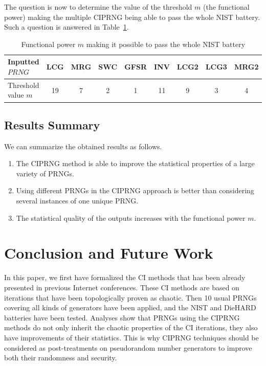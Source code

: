 \documentclass[10pt, conference, compsocconf]{IEEEtran}
\begin{document}
The question is now to determine the value of the threshold $m$ (the functional power) making 
the multiple CIPRNG being able to pass the whole NIST battery.
Such a question is answered in Table~\ref{threshold}.


\begin{table}
\renewcommand{\arraystretch}{1.3}
\caption{Functional power $m$ making it possible to pass the whole NIST battery}
\label{threshold}
\centering
  \begin{tabular}{|l||c|c|c|c|c|c|c|c|}
    \hline
Inputted $PRNG$ & LCG & MRG & SWC & GFSR & INV& LCG2 & LCG3  & MRG2 \\ \hline\hline
Threshold  value $m$& 19 & 7  & 2& 1 & 11& 9& 3& 4\\ \hline\hline
\end{tabular}
\end{table}

\subsection{Results Summary}

We can summarize the obtained results as follows.
\begin{enumerate}
\item The CIPRNG method is able to improve the statistical properties of a large variety of PRNGs.
\item Using different PRNGs in the CIPRNG approach is better than considering several instances of one unique PRNG.
\item The statistical quality of the outputs increases with the functional power $m$.
\end{enumerate}

\section{Conclusion and Future Work}

In this paper, we first have formalized the CI methods that has been already presented in previous Internet conferences.
These CI methods are based on iterations that have been topologically proven as chaotic.
Then 10 usual PRNGs covering all kinds of generators have been applied, and the NIST and DieHARD batteries have been tested.
Analyses show that PRNGs using the CIPRNG methods do not only inherit the chaotic properties of the
CI iterations, they also have improvements of their statistics.
This is why CIPRNG techniques should be considered as post-treatments on pseudorandom number generators to improve both their randomness and security.
\end{document}
